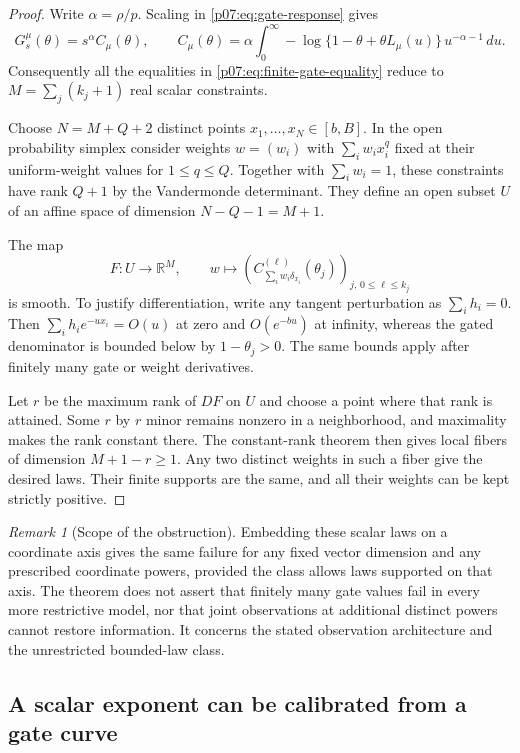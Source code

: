 \documentclass[11pt,letterpaper]{article}
\theoremstyle{definition}
\theoremstyle{remark}
\newtheorem{remark}[theorem]{Remark}
\newcommand{\R}{\mathbb R}
\newcommand{\1}{\mathbf 1}
\begin{document}
\begin{proof}
Write $\alpha=\rho/p$. Scaling in \eqref{p07:eq:gate-response} gives
\[
 G_s^\mu(\theta)=s^\alpha C_\mu(\theta),\qquad
 C_\mu(\theta)=\alpha\int_0^\infty
  -\log\{1-\theta+\theta L_\mu(u)\}\,u^{-\alpha-1}\,du.
\]
Consequently all the equalities in \eqref{p07:eq:finite-gate-equality} reduce
to $M=\sum_j(k_j+1)$ real scalar constraints.

Choose $N=M+Q+2$ distinct points $x_1,\ldots,x_N\in[b,B]$.
In the open probability simplex consider weights $w=(w_i)$ with
$\sum_iw_ix_i^q$ fixed at their uniform-weight values for $1\leq q\leq Q$.
Together with $\sum_iw_i=1$, these constraints have rank $Q+1$ by the
Vandermonde determinant. They define an open subset $U$ of an affine space
of dimension $N-Q-1=M+1$.

The map
\[
 F:U\longrightarrow\R^M,\qquad
 w\longmapsto\left(C_{\sum_iw_i\delta_{x_i}}^{(\ell)}(\theta_j)
              \right)_{j,\,0\leq\ell\leq k_j}
\]
is smooth. To justify differentiation, write any tangent perturbation as
$\sum_i h_i=0$. Then
$\sum_i h_i e^{-ux_i}=O(u)$ at zero and $O(e^{-bu})$ at infinity,
whereas the gated denominator is bounded below by $1-\theta_j>0$.
The same bounds apply after finitely many gate or weight derivatives.

Let $r$ be the maximum rank of $DF$ on $U$ and choose a point where that
rank is attained. Some $r$ by $r$ minor remains nonzero in a neighborhood,
and maximality makes the rank constant there. The constant-rank theorem
then gives local fibers of dimension $M+1-r\geq1$. Any two distinct
weights in such a fiber give the desired laws. Their finite supports are
the same, and all their weights can be kept strictly positive.
\end{proof}

\begin{remark}[Scope of the obstruction]
Embedding these scalar laws on a coordinate axis gives the same failure
for any fixed vector dimension and any prescribed coordinate powers,
provided the class allows laws supported on that axis. The theorem does
not assert that finitely many gate values fail in every more restrictive
model, nor that joint observations at additional distinct powers cannot
restore information. It concerns the stated observation architecture and
the unrestricted bounded-law class.
\end{remark}

\subsection{A scalar exponent can be calibrated from a gate curve}
\end{document}
